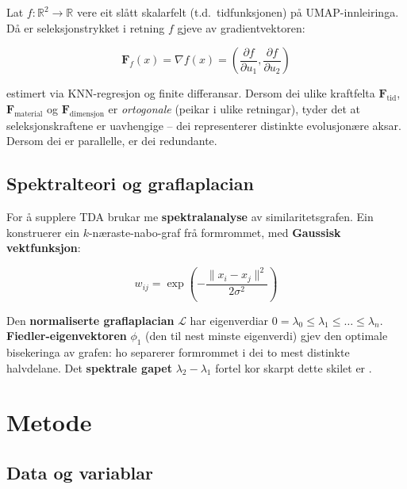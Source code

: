 \documentclass[10pt, a4paper, twocolumn]{article}
\begin{document}
Lat $f: \mathbb{R}^2 \to \mathbb{R}$ vere eit sl\aa tt skalarfelt (t.d.\ tidfunksjonen) p\aa{} UMAP-innleiringa. D\aa{} er seleksjonstrykket i retning $f$ gjeve av gradientvektoren:

\begin{equation}
\mathbf{F}_f(x) = \nabla f(x) = \left( \frac{\partial f}{\partial u_1}, \frac{\partial f}{\partial u_2} \right)
\label{eq:gradient}
\end{equation}

\noindent estimert via KNN-regresjon og finite differansar. Dersom dei ulike kraftfelta $\mathbf{F}_\text{tid}$, $\mathbf{F}_\text{material}$ og $\mathbf{F}_\text{dimensjon}$ er \emph{ortogonale} (peikar i ulike retningar), tyder det at seleksjonskraftene er uavhengige -- dei representerer distinkte evolusjon\ae re aksar. Dersom dei er parallelle, er dei redundante.


\subsection{Spektralteori og graflaplacian}

For \aa{} supplere TDA brukar me \textbf{spektralanalyse} av similaritetsgrafen. Ein konstruerer ein $k$-n\ae raste-nabo-graf fr\aa{} formrommet, med \textbf{Gaussisk vektfunksjon}:

\begin{equation}
w_{ij} = \exp\!\left(-\frac{\|x_i - x_j\|^2}{2\sigma^2}\right)
\label{eq:weights}
\end{equation}

\noindent Den \textbf{normaliserte graflaplacian} $\mathcal{L}$ har eigenverdiar $0 = \lambda_0 \leq \lambda_1 \leq \ldots \leq \lambda_n$. \textbf{Fiedler-eigenvektoren} $\phi_1$ (den til nest minste eigenverdi) gjev den optimale bisekeringa av grafen: ho separerer formrommet i dei to mest distinkte halv\-delane. Det \textbf{spektrale gapet} $\lambda_2 - \lambda_1$ fortel kor skarpt dette skilet er \citep{vonLuxburg2007}.


\section{Metode}
\label{sec:metode}

\subsection{Data og variablar}
\end{document}
